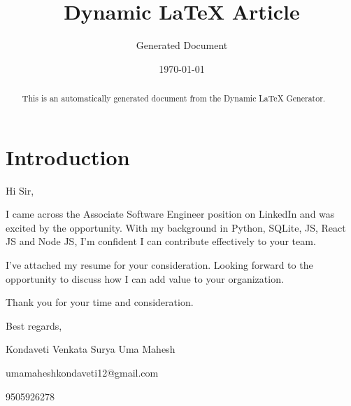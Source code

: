 \documentclass[12pt]{article}
\title{Dynamic LaTeX Article}
\author{Generated Document}
\date{\today}
\begin{document}
\maketitle

\begin{abstract}
This is an automatically generated document from the Dynamic LaTeX Generator.
\end{abstract}

\section*{Introduction}

Hi Sir,

I came across the Associate Software Engineer position on LinkedIn and was excited by the opportunity. With my background in Python, SQLite, JS, React JS and Node JS, I’m confident I can contribute effectively to your team.

I've attached my resume for your consideration. Looking forward to the opportunity to discuss how I can add value to your organization.

Thank you for your time and consideration.

Best regards,

Kondaveti Venkata Surya Uma Mahesh

umamaheshkondaveti12@gmail.com

9505926278
\end{document}

